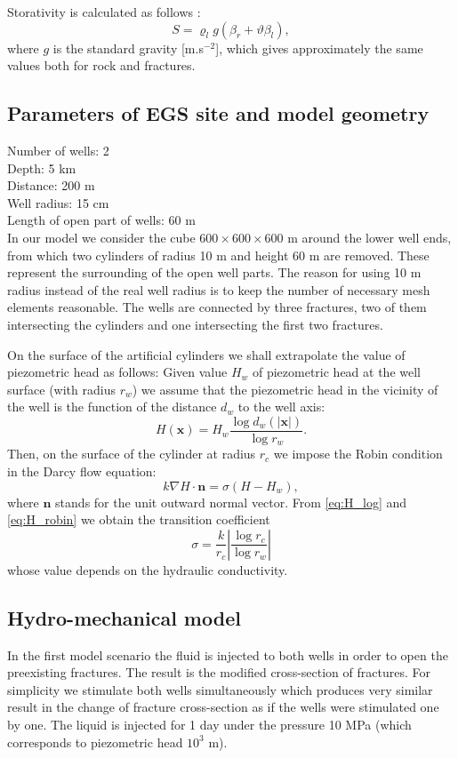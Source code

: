 \documentclass{article}
\newcommand{\eq}[1]{\begin{equation}#1\end{equation}}
\newcommand{\nn}{\vc n}
\newcommand{\vc}[1]{\boldsymbol{#1}}
\newcommand{\xx}{\vc x}
\begin{document}
Storativity is calculated as follows \cite{brace-et-al}:
\[ S = \varrho_l g(\beta_r + \vartheta\beta_l), \]
where $g$ is the standard gravity [m.s${}^{-2}$], which gives approximately the same values both for rock and fractures.

\subsection{Parameters of EGS site and model geometry}

Number of wells: 2 \\
Depth: 5 km \\
Distance: 200 m \\
Well radius: 15 cm \\
Length of open part of wells: 60 m \\


In our model we consider the cube $600 \times 600 \times 600$ m around the lower well ends, from which two cylinders of radius 10 m and height 60 m are removed.
These represent the surrounding of the open well parts.
The reason for using 10 m radius instead of the real well radius is to keep the number of necessary mesh elements reasonable.
The wells are connected by three fractures, two of them intersecting the cylinders and one intersecting the first two fractures.

On the surface of the artificial cylinders we shall extrapolate the value of piezometric head as follows: Given value $H_w$ of piezometric head at the well surface (with radius $r_w$) we assume that the piezometric head in the vicinity of the well is the function of the distance $d_w$ to the well axis:
\eq{\label{eq:H_log} H(\xx) = H_w\frac{\log d_w(|\xx|)}{\log r_w}. }
Then, on the surface of the cylinder at radius $r_c$ we impose the Robin condition in the Darcy flow equation:
\eq{\label{eq:H_robin} k\nabla H\cdot\nn = \sigma(H-H_w), }
where $\nn$ stands for the unit outward normal vector.
From \eqref{eq:H_log} and \eqref{eq:H_robin} we obtain the transition coefficient
\[ \sigma = \frac{k}{r_c}\left|\frac{\log r_c}{\log r_w}\right| \]
whose value depends on the hydraulic conductivity.


\subsection{Hydro-mechanical model}
\label{sc:hm_model}

In the first model scenario the fluid is injected to both wells in order to open the preexisting fractures.
The result is the modified cross-section of fractures.
For simplicity we stimulate both wells simultaneously which produces very similar result in the change of fracture cross-section as if the wells were stimulated one by one.
The liquid is injected for 1 day under the pressure 10 MPa (which corresponds to piezometric head $10^3$ m).
\end{document}
